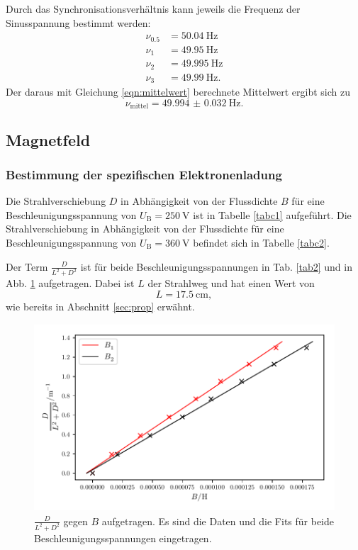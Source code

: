 \noindent Durch das Synchronisationsverhältnis
kann jeweils die Frequenz der Sinusspannung bestimmt werden:
\begin{align*}
    \nu_{0.5} &= \SI{50.04}{\hertz} \\
    \nu_1 &= \SI{49.95}{\hertz} \\
    \nu_2 &= \SI{49.995}{\hertz} \\
    \nu_3 &= \SI{49.99}{\hertz}.
\end{align*}
Der daraus mit Gleichung \eqref{eqn:mittelwert}
berechnete Mittelwert ergibt sich zu
\begin{equation*}
    \nu_\text{mittel} = \SI{49.994(32)}{\hertz}.
\end{equation*}


\subsection{Magnetfeld}
\subsubsection{Bestimmung der spezifischen Elektronenladung}
Die Strahlverschiebung $D$ in Abhängigkeit von der Flussdichte $B$
für eine Beschleunigungsspannung von $U_\text{B} = \SI{250}{\volt}$
ist in Tabelle \ref{tabc1} aufgeführt. Die Strahlverschiebung in
Abhängigkeit von der Flussdichte für eine Beschleunigungsspannung
von $U_\text{B} = \SI{360}{\volt}$ befindet sich in Tabelle \ref{tabc2}.



\noindent Der Term $\frac{D}{L^2 + D^2}$ ist für beide Beschleunigungsspannungen
in Tab. \ref{tab2} und in Abb. \ref{fig:plot2} aufgetragen. Dabei ist $L$ der Strahlweg und
hat einen Wert von
\begin{equation*}
    L = \SI{17.5}{\centi\meter},
\end{equation*}
wie bereits in Abschnitt \ref{sec:prop} erwähnt.



\begin{figure}
    \centering
    \includegraphics[width=12cm, height=7cm]{build/plot2.pdf}
    \caption{$\frac{D}{L^2 + D^2}$ gegen $B$ aufgetragen.
    Es sind die Daten und die Fits für beide Beschleunigungsspannungen
    eingetragen.}
    \label{fig:plot2}
\end{figure}

